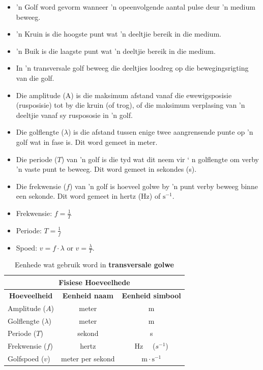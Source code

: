             \nopagebreak
      \label{m38806*id324089}\begin{itemize}[noitemsep] 
            \label{m38806*uid108}\item 'n Golf word gevorm wanneer 'n opeenvolgende aantal pulse deur 'n medium beweeg.
\label{m38806*uid109}\item  'n Kruin is die hoogste punt wat  'n deeltjie bereik in die medium.
\label{m38806*uid110}\item 'n Buik is die laagste punt wat  'n deeltjie bereik in die medium.
\label{m38806*uid111}\item In 'n transversale golf beweeg die deeltjies loodreg op die bewegingsrigting van die golf.
\label{m38806*uid112}\item Die amplitude (A) is die maksimum afstand vanaf die ewewigsposisie (rusposisie) tot by die kruin 
       (of trog), of die maksimum verplasing van 'n deeltjie vanaf sy ruspososie in 'n golf.
\label{m38806*uid113}\item Die golflengte ($\lambda $) is die afstand tussen enige twee aangrensende punte op 'n golf wat in
         fase is. Dit word gemeet in meter.
\label{m38806*uid114}\item Die periode ($T$) van 'n golf is die tyd wat dit neem vir  ‘ n golflengte om verby  'n vaste punt te beweeg.
       Dit word gemeet in sekondes (s).
\label{m38806*uid115}\item Die frekwensie ($f$) van 'n golf is hoeveel golwe by 'n punt verby beweeg binne een sekonde. Dit word
       gemeet in hertz (Hz) of $\text{s}{}^{-1}$.
\label{m38806*uid116}\item Frekwensie: $f=\frac{1}{T}$\label{m38806*uid117}\item Periode: $T=\frac{1}{f}$\label{m38806*uid118}\item Spoed: $v=f\cdot\lambda $ or $v=\frac{\lambda }{T}$.
\end{itemize}
\begin{table}[H]
\begin{center}
\begin{tabular}{|l|c|c|}\hline \hline 
\multicolumn{3}{|c|}{\textbf{Fisiese Hoeveelhede}}\\ \hline \hline
\multicolumn{1}{|c|}{\textbf{Hoeveelheid}} & \textbf{Eenheid naam} & \textbf{Eenheid simbool}\\ \hline
Amplitude ($A$) & meter & m \\ \hline
Golflengte ($\lambda$) & meter & m \\ \hline
Periode ($T$) & sekond & s \\ \hline
Frekwensie ($f$) & hertz & Hz \ \ ($s^{-1}$) \\ \hline
Golfspoed ($v$) & meter per sekond & $\text{m} \cdot \text{s}^{-1}$ \\ \hline
\end{tabular}
\end{center}
\caption{Eenhede wat gebruik word in \textbf{transversale golwe} }
\label{table:electrostatics::units}
\end{table}
